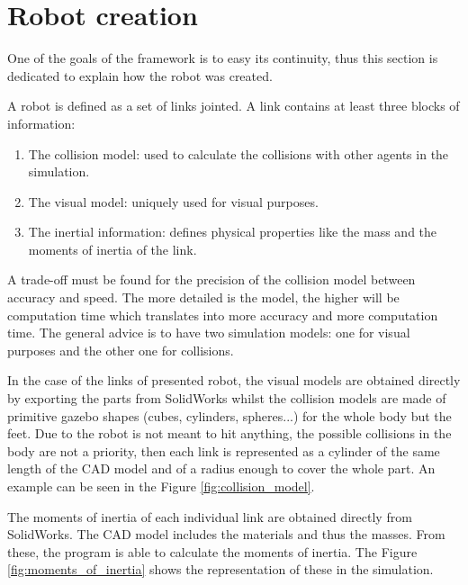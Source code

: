 \section{Robot creation} %
\label{sec:robot_creation}
One of the goals of the framework is to easy its continuity, thus this section is dedicated to explain how the robot was created.

A robot is defined as a set of links jointed.
A link contains at least three blocks of information:
\begin{enumerate}
   \item The collision model: used to calculate the collisions with other agents in the simulation.
   \item The visual model: uniquely used for visual purposes.
   \item The inertial information: defines physical properties like the mass and the moments of inertia of the link.
\end{enumerate} 

A trade-off must be found for the precision of the collision model between accuracy and speed.
The more detailed is the model, the higher will be computation time which translates into more accuracy and more computation time.
The general advice is to have two simulation models: one for visual purposes and the other one for collisions.

In the case of the links of presented robot, the visual models are obtained directly by exporting the parts from SolidWorks whilst the collision models are made of primitive gazebo shapes (cubes, cylinders, spheres...) for the whole body but the feet.
Due to the robot is not meant to hit anything, the possible collisions in the body are not a priority, then each link is represented as a cylinder of the same length of the CAD model and of a radius enough to cover the whole part.
An example can be seen in the Figure \ref{fig:collision_model}.

The moments of inertia of each individual link are obtained directly from SolidWorks.
The CAD model includes the materials and thus the masses.
From these, the program is able to calculate the moments of inertia.
The Figure \ref{fig:moments_of_inertia} shows the representation of these in the simulation.


